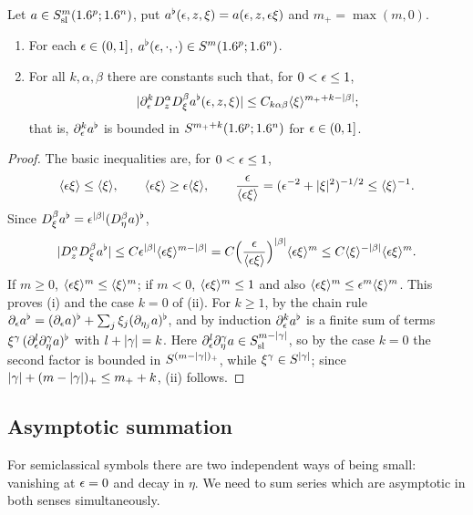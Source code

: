 \begin{lemma}\label{semiclassical:lem:rescale}
  Let $a\in S^{m}_{\mathrm{sl}}(1.6^p;1.6^n)$, put $a^\flat(\epsilon,z,\xi)=a(\epsilon,z,\epsilon\xi)$ and
  $m_+=\max(m,0)$.
  \begin{enumerate}[label=\textup{(\roman*)}]
  \item For each $\epsilon\in(0,1]$, $a^\flat(\epsilon,\cdot,\cdot)\in S^m(1.6^p;1.6^n)$.
  \item For all $k,\alpha,\beta$ there are constants such that, for $0<\epsilon\le1$,
    \begin{equation*}
      \lvert \partial^k_\epsilon D^\alpha_zD^\beta_\xi a^\flat(\epsilon,z,\xi)\rvert\le
      C_{k\alpha\beta}\langle \xi\rangle^{m_++k-\lvert \beta\rvert};
    \end{equation*}
    that is, $\partial_\epsilon^ka^\flat$ is bounded in $S^{m_++k}(1.6^p;1.6^n)$ for
    $\epsilon\in(0,1]$.
  \end{enumerate}
\end{lemma}
\begin{proof}
  The basic inequalities are, for $0<\epsilon\le1$,
  \begin{equation*}
    \langle \epsilon\xi\rangle\le\langle \xi\rangle,\qquad \langle \epsilon\xi\rangle\ge\epsilon\langle \xi\rangle,\qquad
    \frac{\epsilon}{\langle \epsilon\xi\rangle}=(\epsilon^{-2}+\lvert \xi\rvert^2)^{-1/2}\le\langle \xi\rangle^{-1}.
  \end{equation*}
  Since $D^\beta_\xi a^\flat=\epsilon^{\lvert \beta\rvert}(D^\beta_\eta a)^\flat$,
  \begin{equation*}
    \lvert D^\alpha_zD^\beta_\xi a^\flat\rvert\le C\epsilon^{\lvert \beta\rvert}\langle \epsilon\xi\rangle^{m-\lvert \beta\rvert}
    =C\Bigl(\frac{\epsilon}{\langle \epsilon\xi\rangle}\Bigr)^{\lvert \beta\rvert}\langle \epsilon\xi\rangle^m
    \le C\langle \xi\rangle^{-\lvert \beta\rvert}\langle \epsilon\xi\rangle^m.
  \end{equation*}
  If $m\ge0$, $\langle \epsilon\xi\rangle^m\le\langle \xi\rangle^m$; if $m<0$, $\langle \epsilon\xi\rangle^m\le1$
  and also $\langle \epsilon\xi\rangle^m\le\epsilon^m\langle \xi\rangle^m$. This proves (i) and the case
  $k=0$ of (ii). For $k\ge1$, by the chain rule
  $\partial_\epsilon a^\flat=(\partial_\epsilon a)^\flat+\sum_j\xi_j(\partial_{\eta_j}a)^\flat$, and by
  induction $\partial_\epsilon^ka^\flat$ is a finite sum of terms
  $\xi^\gamma\,(\partial_\epsilon^{l}\partial_\eta^\gamma a)^\flat$ with $l+\lvert \gamma\rvert=k$. Here
  $\partial_\epsilon^l\partial^\gamma_\eta a\in S^{m-\lvert \gamma\rvert}_{\mathrm{sl}}$, so by the case $k=0$ the
  second factor is bounded in $S^{(m-\lvert \gamma\rvert)_+}$, while $\xi^\gamma\in
  S^{\lvert \gamma\rvert}$; since $\lvert \gamma\rvert+(m-\lvert \gamma\rvert)_+\le m_++k$, (ii) follows.
\end{proof}

\subsection{Asymptotic summation}
For semiclassical symbols there are two independent ways of being small:
vanishing at $\epsilon=0$ and decay in $\eta$. We need to sum series which are
asymptotic in both senses simultaneously.

